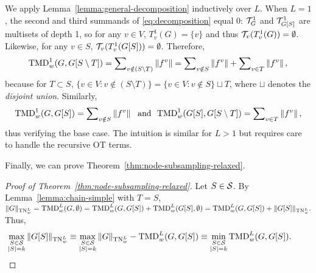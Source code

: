 \begin{hproof} We apply Lemma~\ref{lemma:general-decomposition} {inductively over $L$}. When $L=1$, the second and third summands of \eqref{eq:decomposition} equal 0: $\mathcal T_G^1$ and $\mathcal T_{G[S]}^1$ are multisets of depth 1, so for any $v \in V$, $T_v^1(G) = \{v\}$ and thus $\mathcal T_v(T_v^1(G)) = \emptyset$. Likewise, for any $v \in S$, $\mathcal T_v(T_v^1(G[S])) = \emptyset$. Therefore, 
\begin{align*}
    \textnormal{TMD}_w^1(G, G[S \setminus T]) = \sum\nolimits_{v \notin (S \setminus T) } \left\lVert f^v\right\rVert = \sum\nolimits_{v\notin S} \left\lVert f^v\right\rVert + \sum\nolimits_{v \in T} \left\lVert f^v\right\rVert, 
\end{align*} 
because for $T \subset S$, $\{v \in V : v \notin (S \setminus T) \} = \{v \in V : v \notin S\} \sqcup T$, where $\sqcup$ denotes the \emph{disjoint union}.
Similarly, 
\begin{align*}
    \textnormal{TMD}_w^1(G, G[S]) = \sum\nolimits_{v \notin S} \left\lVert f^v\right\rVert \text{\,\,\,\,and\,\,\,\,} \textnormal{TMD}_w^1(G[S], G[S \setminus T]) = \sum\nolimits_{v \in T} \left\lVert f^v\right\rVert, 
\end{align*} 
thus verifying the base case. The intuition is similar for $L>1$ but requires
care to handle the recursive OT terms.
\end{hproof}

Finally, we can prove Theorem~\ref{thm:node-subsampling-relaxed}.

\begin{proof}[Proof of Theorem~\ref{thm:node-subsampling-relaxed}] Let $S \in \mathcal S$. By Lemma~\ref{lemma:chain-simple} with $T = S$, $\Vert G \Vert_{\textnormal{TN}_w^L} =  \textnormal{TMD}_w^L(G, \emptyset) = \textnormal{TMD}_w^L(G, G[S]) + \textnormal{TMD}_w^L(G[S], \emptyset) = \textnormal{TMD}_w^L(G, G[S]) + \Vert G[S] \Vert_{\textnormal{TN}_w^L}.$  Thus, 
\begin{align*}
    \max_{\substack{S \in \mathcal S \\ \left\lvert S\right\rvert = k}}
 \Vert G[S] \Vert_{\textnormal{TN}_w^L} \equiv \max_{\substack{S \in \mathcal S \\ \left\lvert S\right\rvert = k}} \Vert G \Vert_{\textnormal{TN}_w^L} - \textnormal{TMD}_w^L(G, G[S]) \equiv \min_{\substack{S \in \mathcal S \\ \left\lvert S\right\rvert = k}} \textnormal{TMD}_w^L(G, G[S]). \tag*{\qedhere} 
\end{align*}
\end{proof}





